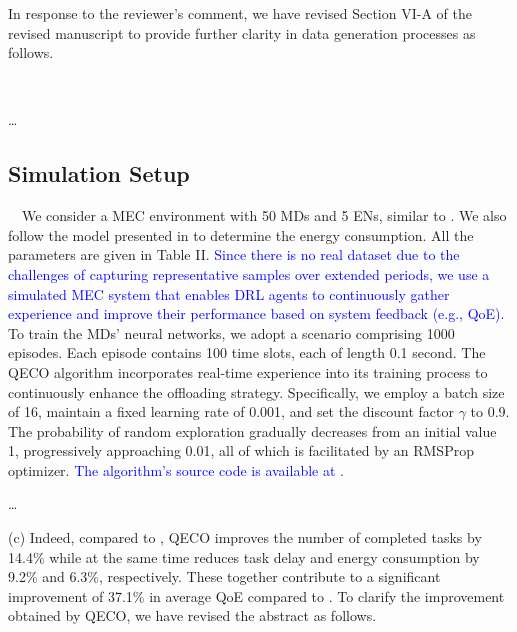 \documentclass[12pt,draftclsnofoot,onecolumn]{IEEEtran}
\newcommand{\rev}[1]{{\color{blue}#1}} %
\newcommand{\rev}[1]{#1}
\newenvironment{my}[2]%
{\begin{list}{}%
{\setlength{\rightmargin}{#1}\setlength{\leftmargin}{#2}}%


 \item[]{}

} {\end{list}}
\begin{document}
\begin{enumerate}
In response to the reviewer’s comment, we have revised Section VI-A of the revised manuscript to provide further clarity in data generation processes as follows.

\setcounter{subsection}{0}
\setcounter{table}{0}
		\begin{my}{1cm}{1cm}
	\rev{
		{\ 
			
			\dots \color{black} \vspace{-4mm}
			
\subsection{Simulation Setup}
\,\,\,\, We consider a MEC environment with 50 MDs and 5 ENs, similar to \cite{9253665}. We also follow the model presented in \cite{zhou2021deep} to determine the energy consumption. All the parameters are given in Table II. \textcolor{blue}{Since there is no real dataset due to the challenges of capturing representative samples over extended periods, we use a simulated MEC system that enables DRL agents to continuously gather experience and improve their performance based on system feedback (e.g., QoE).} To train the MDs' neural networks, we adopt a scenario comprising 1000 episodes. Each episode contains 100 time slots, each of length 0.1 second. The QECO algorithm incorporates real-time experience into its training process to continuously enhance the offloading strategy. Specifically, we employ a batch size of 16, maintain a fixed learning rate of 0.001, and set the discount factor $\gamma$ to 0.9. The probability of random exploration gradually decreases from an initial value 1, progressively approaching 0.01, all of which is facilitated by an RMSProp optimizer. \textcolor{blue}{The algorithm's source code is available at \cite{QECO}}. 


\color{blue}
\dots 

}}

\end{my}


\vspace{6mm}

(c) Indeed, compared to \cite{yang2018distributed}, QECO improves the number of completed tasks by 14.4\% while at the same time reduces task delay and energy consumption by 9.2\% and 6.3\%, respectively. These together contribute to a significant improvement of 37.1\% in average QoE compared to \cite{yang2018distributed}. To clarify the improvement obtained by QECO, we have revised the abstract as follows. \vspace{4mm}



\end{enumerate}
\end{document}
